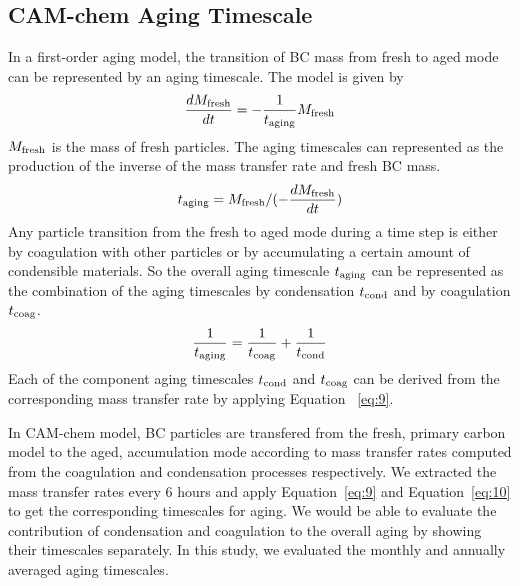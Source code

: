 \documentclass[12pt]{article}
\begin{document}
		 \subsection{CAM-chem Aging Timescale}
		 In a first-order aging model, the transition of BC mass from fresh to aged mode can be represented by an aging timescale. The model is given by
		 \begin{align}
		 \frac{dM_{\rm{fresh}}}{dt} = -\frac{1}{t_{\rm{aging}}}M_{\rm{fresh}} 
		 \end{align}
		 $M_{\rm{fresh}}$ is the mass of fresh particles.
		 The aging timescales can represented as the production of the inverse of the mass transfer rate and fresh BC mass. 
		 \begin{align}\label{eq:9}
		 t_{\rm{aging}} = M_{\rm{fresh}}/(-\frac{dM_{\rm{fresh}}}{dt})
		 \end{align}
		 Any particle transition from the fresh to aged mode during a time step is either by coagulation with other particles or by accumulating a certain amount of condensible materials. So the overall aging timescale $t_{\rm{aging}}$ can be represented as the combination of the aging timescales by condensation $t_{\rm{cond}}$ and by coagulation $t_{\rm{coag}}$.
		 \begin{align}\label{eq:10}
		 \frac{1}{t_{\rm{aging}}} =\frac{1}{t_{\rm{coag}}} + \frac{1}{t_{\rm{cond}}}
		 \end{align}
		 Each of the component aging timescales $t_{\rm{cond}}$ and $t_{\rm{coag}}$ can be derived from the corresponding mass transfer rate by applying Equation~ \ref{eq:9}. 
		 
		 In CAM-chem model, BC particles are transfered from the fresh, primary carbon model to the aged, accumulation mode according to mass transfer rates computed from the coagulation and condensation processes respectively. We extracted the mass transfer rates every 6 hours and apply Equation~\ref{eq:9} and Equation~\ref{eq:10} to get the corresponding timescales for aging. We would be able to evaluate the contribution of condensation and coagulation to the overall aging by showing their  timescales separately. In this study, we evaluated the monthly and annually averaged aging timescales. 
		 
\end{document}
